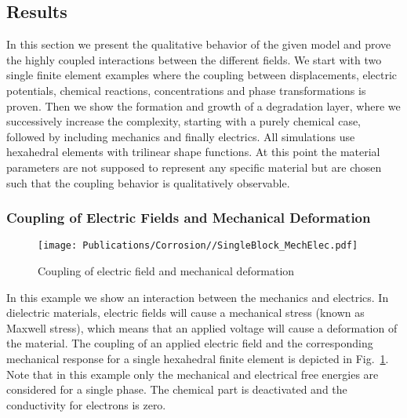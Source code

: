 \subsection{Results} \label{sec:results}
In this section we present the qualitative behavior of the given model and prove the highly coupled interactions between the different fields. We start with two single finite element examples where the coupling between displacements, electric potentials, chemical reactions, concentrations and phase transformations is proven. Then we show the formation and growth of a degradation layer, where we successively increase the complexity, starting with a purely chemical case, followed by including mechanics and finally electrics. All simulations use hexahedral elements with trilinear shape functions. At this point the material parameters are not supposed to represent any specific material but are chosen such that the coupling behavior is qualitatively observable. 

\subsubsection{Coupling of Electric Fields and Mechanical Deformation}
\begin{figure}[h!]
  \centering
  \texttt{[image: Publications/Corrosion//SingleBlock\_MechElec.pdf]}
  \caption[]{Coupling of electric field and mechanical deformation}
  \label{fig:SingleBlock_MechElec}
\end{figure}
In this example we show an interaction between the mechanics and electrics. In dielectric materials, electric fields will cause a mechanical stress (known as Maxwell stress), which means that an applied voltage will cause a deformation of the material. The coupling of an applied electric field and the corresponding mechanical response for a single hexahedral finite element is depicted in Fig.~\ref{fig:SingleBlock_MechElec}. Note that in this example only the mechanical and electrical free energies are considered for a single phase. The chemical part is deactivated and the conductivity for electrons is zero. 



